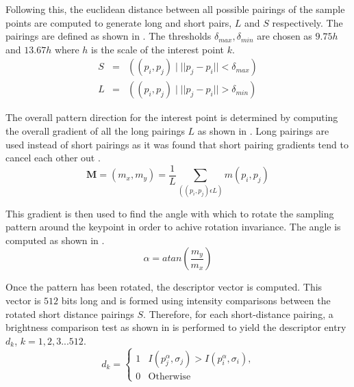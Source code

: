 \documentclass{article}
\begin{document}
Following this, the euclidean distance between all possible pairings of the sample points are computed to generate long and short pairs, $L$ and $S$ respectively. The pairings are defined as shown in . The thresholds $ \delta_{max},  \delta_{min}$ are chosen as $9.75h$ and $13.67h$ where $h$ is the scale of the interest point $k$. \\   


\begin{eqnarray}
S &=& ((p_i, p_j) \mid ||p_j - p_i|| < \delta_{max})\\
L &=& ((p_i, p_j) \mid ||p_j - p_i|| > \delta_{min})
\label{eqn:pairings}
\end{eqnarray} 

The overall pattern direction for the interest point is determined by computing the overall gradient of all the long pairings $L$ as shown in . Long pairings are used instead of short pairings as it was found that short pairing gradients tend to cancel each other out \cite{Leutenegger2011}. \\

\begin{equation}
\textbf{M} = (m_x, m_y) = \frac{1}{L} \sum_{((p_i, p_j) \epsilon L)} m(p_i,p_j)
\label{eqn:longGradients}
\end{equation}

This gradient is then used to find the angle with which to rotate the sampling pattern around the keypoint in order to achive rotation invariance. The angle is computed as shown in . \\

\begin{equation}
\alpha = atan(\frac{m_y}{m_x})
\label{eqn:angle}
\end{equation}

Once the pattern has been rotated, the descriptor vector is computed. This vector is $512$ bits long and is formed using intensity comparisons between the rotated short distance pairings $S$. Therefore, for each short-distance pairing, a brightness comparison test as shown in  is performed to yield the descriptor entry $d_k$, $k = 1,2,3...512$.\\

\begin{equation}
d_k = \left\{ \begin{array}{rl}
1 &\mbox{$I(p_j^{\alpha}, \sigma_j) > I(p_i^{\alpha}, \sigma_i)$,} \\
0 &\mbox{Otherwise}
\end{array} \right.
\label{eqn:brightness}
\end{equation}
\end{document}
